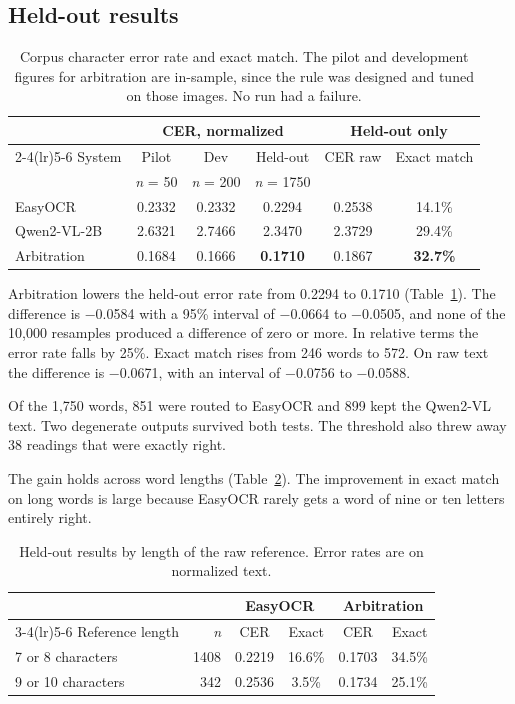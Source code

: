 \documentclass[11pt,a4paper]{article}
\begin{document}
\subsection{Held-out results}

\begin{table}[H]
\centering
\small
\begin{tabular}{lccccc}
\toprule
 & \multicolumn{3}{c}{CER, normalized} & \multicolumn{2}{c}{Held-out only} \\
\cmidrule(lr){2-4}\cmidrule(lr){5-6}
System & Pilot & Dev & Held-out & CER raw & Exact match \\
 & \emph{n} = 50 & \emph{n} = 200 & \emph{n} = 1750 & & \\
\midrule
EasyOCR & 0.2332 & 0.2332 & 0.2294 & 0.2538 & 14.1\% \\
Qwen2-VL-2B & 2.6321 & 2.7466 & 2.3470 & 2.3729 & 29.4\% \\
Arbitration & 0.1684 & 0.1666 & \textbf{0.1710} & 0.1867 & \textbf{32.7\%} \\
\bottomrule
\end{tabular}
\caption{Corpus character error rate and exact match. The pilot and
development figures for arbitration are in-sample, since the rule was designed
and tuned on those images. No run had a failure.}
\label{tab:main}
\end{table}

Arbitration lowers the held-out error rate from 0.2294 to 0.1710
(Table~\ref{tab:main}). The difference is −0.0584 with a 95\% interval of
−0.0664 to −0.0505, and none of the 10,000 resamples produced a difference
of zero or more. In relative terms the error rate falls by 25\%. Exact match
rises from 246 words to 572. On raw text the difference is −0.0671, with an
interval of −0.0756 to −0.0588.

Of the 1,750 words, 851 were routed to EasyOCR and 899 kept the Qwen2-VL
text. Two degenerate outputs survived both tests. The threshold also threw
away 38 readings that were exactly right.

The gain holds across word lengths (Table~\ref{tab:slices}). The improvement
in exact match on long words is large because EasyOCR rarely gets a word of
nine or ten letters entirely right.

\begin{table}[H]
\centering
\small
\begin{tabular}{lrcccc}
\toprule
 & & \multicolumn{2}{c}{EasyOCR} & \multicolumn{2}{c}{Arbitration} \\
\cmidrule(lr){3-4}\cmidrule(lr){5-6}
Reference length & \emph{n} & CER & Exact & CER & Exact \\
\midrule
7 or 8 characters & 1408 & 0.2219 & 16.6\% & 0.1703 & 34.5\% \\
9 or 10 characters & 342 & 0.2536 & 3.5\% & 0.1734 & 25.1\% \\
\bottomrule
\end{tabular}
\caption{Held-out results by length of the raw reference. Error rates are on
normalized text.}
\label{tab:slices}
\end{table}
\end{document}
